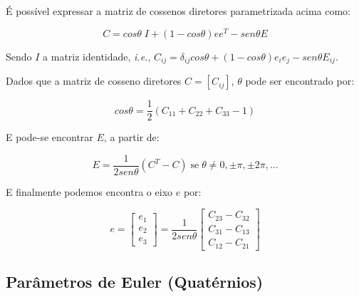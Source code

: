 É possível expressar a matriz de cossenos diretores parametrizada acima como:

\begin{equation}C=cos\theta\; I + (1-cos\theta)ee^T-sen\theta E\end{equation}

Sendo \begin{math}I\end{math} a matriz identidade, \textit{i.e.}, \begin{math}C_{ij}=\delta_{ij}cos\theta+(1-cos\theta)e_ie_j-sen\theta E_{ij}\end{math}.

Dados que a matriz de cosseno diretores \begin{math}C=[C_{ij}]\end{math}, \begin{math}\theta\end{math} pode ser encontrado por:

\begin{equation}cos\theta = \frac{1}{2}(C_{11}+C_{22}+C_{33}-1)\end{equation}

E pode-se encontrar \begin{math} E\end{math}, a partir de:

\begin{equation}E=\frac{1}{2sen\theta}(C^T-C) \;\text{se}\; \theta\neq0,\pm\pi,\pm2\pi,...\end{equation}

E finalmente podemos encontra o eixo \begin{math}e\end{math} por:

\begin{equation}e=\begin{bmatrix}
e_1 \\ e_2 \\ e_3
\end{bmatrix}=\frac{1}{2sen\theta}\begin{bmatrix}
C_{23}-C_{32} \\ C_{31}-C_{13} \\ C_{12}-C_{21}
\end{bmatrix}\end{equation}

\subsection{Parâmetros de Euler (Quatérnios)}\label{sec:3.1.2.4}

